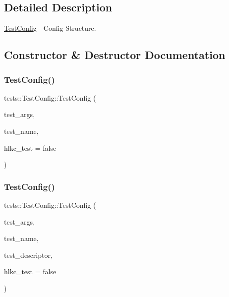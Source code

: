 \subsection{Detailed Description}
\hyperlink{structtests_1_1TestConfig}{Test\+Config} -\/ Config Structure. 

\subsection{Constructor \& Destructor Documentation}
\mbox{\label{structtests_1_1TestConfig_a32eac564ba880bb65d318e8f78de756b}} 
\subsubsection{\texorpdfstring{Test\+Config()}{TestConfig()}\hspace{0.1cm}{\footnotesize\ttfamily [1/2]}}
{\footnotesize\ttfamily tests\+::\+Test\+Config\+::\+Test\+Config (\begin{DoxyParamCaption}\item[{\hyperlink{structtests_1_1TestArgs}{Test\+Args}}]{test\+\_\+args,  }\item[{string}]{test\+\_\+name,  }\item[{bool}]{hlkc\+\_\+test = {\ttfamily false} }\end{DoxyParamCaption})}

\mbox{\label{structtests_1_1TestConfig_a169c374c99e645ce36d61113397220a0}} 
\subsubsection{\texorpdfstring{Test\+Config()}{TestConfig()}\hspace{0.1cm}{\footnotesize\ttfamily [2/2]}}
{\footnotesize\ttfamily tests\+::\+Test\+Config\+::\+Test\+Config (\begin{DoxyParamCaption}\item[{\hyperlink{structtests_1_1TestArgs}{Test\+Args}}]{test\+\_\+args,  }\item[{string}]{test\+\_\+name,  }\item[{Y\+A\+M\+L\+::\+Node}]{test\+\_\+descriptor,  }\item[{bool}]{hlkc\+\_\+test = {\ttfamily false} }\end{DoxyParamCaption})}




